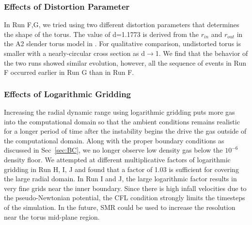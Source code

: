 \documentclass[iop,revtex4]{emulateapj}
\begin{document}
\subsubsection{Effects of Distortion Parameter}
\par In Run F,G, we tried using two different distortion parameters that determines the shape of the torus. The value of d=1.1773 is derived from the $r_{in}$ and $r_{out}$ in the A2 slender torus model in \cite{Hawley:1991A}. For qualitative comparison, undistorted torus is smaller with a nearly-circular cross section as d$\rightarrow$1. We find that the behavior of the two runs showed similar evolution, however, all the sequence of events in Run F occurred earlier in Run G than in Run F.

\subsubsection{Effects of Logarithmic Gridding}
\par  Increasing the radial dynamic range using logarithmic gridding puts more gas into the computational domain so that the ambient conditions remains realistic for a longer period of time after the instability begins the drive the gas outside of the computational domain. Along with the proper boundary conditions as discussed in Sec~\ref{sec:BC}, we no longer observe low density gas below the $10^{-6}$ density floor. We attempted at different multiplicative factors of logarithmic gridding in Run H, I, J and found that a factor of 1.03 is sufficient for covering the large radial domain. In Run I and J, the large logarithmic factor results in very fine grids near the inner boundary. Since there is high infall velocities due to the pseudo-Newtonian potential, the CFL condition strongly limits the timesteps of the simulation. In the future, \ac{SMR} could be used to increase the resolution near the torus mid-plane region.
\end{document}
